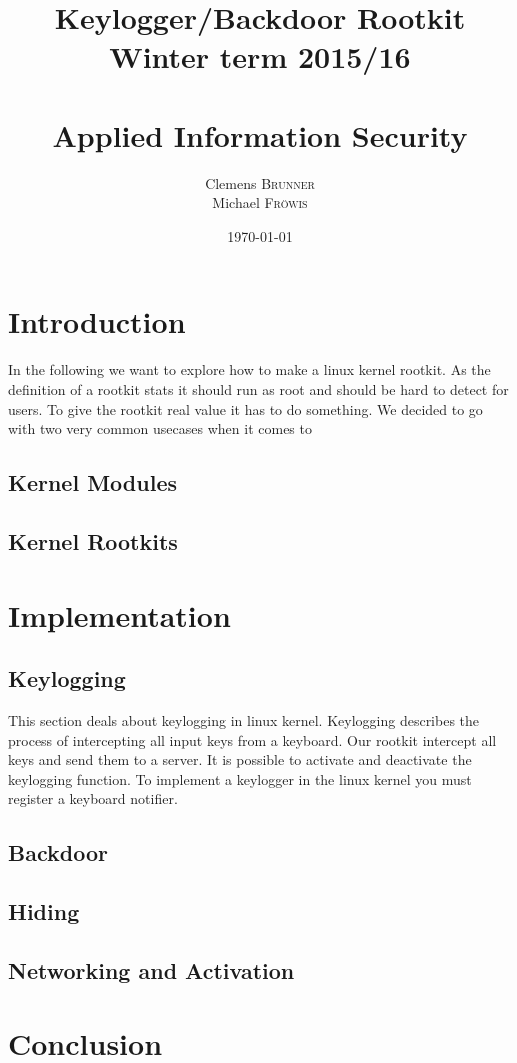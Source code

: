 \documentclass[12pt]{article}
\title{\huge{Keylogger/Backdoor Rootkit} \\\large{Winter term 2015/16} \\\quad \\\huge{Applied Information Security}}
\author{Clemens \textsc{Brunner}\\
        Michael \textsc{Fröwis}} %
\date{\today} %
\begin{document}
\maketitle %
\thispagestyle{empty}
\newpage
\tableofcontents
\thispagestyle{empty}

\newpage

\section{Introduction}

In the following we want to explore how to make a linux kernel rootkit. As the definition of a rootkit stats it should run as root and should be hard to detect for users. To give the rootkit real value it has to do something. We decided to go with two very common usecases when it comes to 


\subsection{Kernel Modules}

\subsection{Kernel Rootkits}

\section{Implementation}
\subsection{Keylogging}
This section deals about keylogging in linux kernel. Keylogging describes the process of intercepting all input keys from a keyboard. Our rootkit intercept all keys and send them to a server. It is possible to activate and deactivate the keylogging function.
To implement a keylogger in the linux kernel you must register a keyboard notifier. 


\subsection{Backdoor}
\subsection{Hiding}
\subsection{Networking and Activation}

\section{Conclusion}
\end{document}
